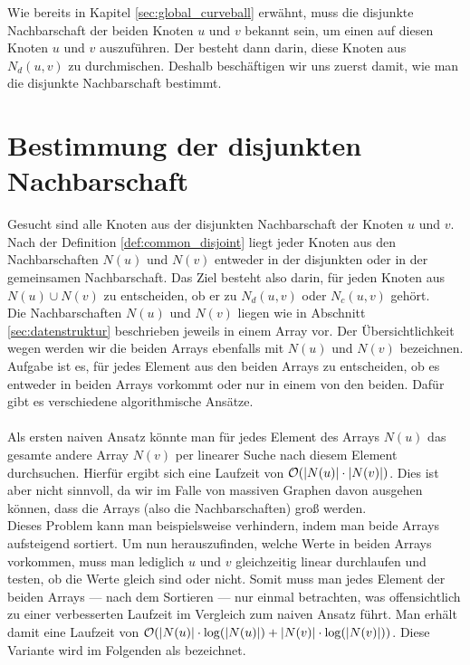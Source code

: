Wie bereits in Kapitel \ref{sec:global_curveball} erwähnt, muss die disjunkte Nachbarschaft
der beiden Knoten $u$ und $v$ bekannt sein, um einen \ct{} auf diesen Knoten $u$ und $v$
auszuführen. Der \ct{} besteht dann darin, diese Knoten aus $N_{d}(u,v)$ zu durchmischen.
Deshalb beschäftigen wir uns zuerst damit, wie man die disjunkte Nachbarschaft bestimmt.


\section{Bestimmung der disjunkten Nachbarschaft}
\label{sec:common}
Gesucht sind alle Knoten aus der disjunkten Nachbarschaft der Knoten $u$ und $v$.
Nach der Definition \ref{def:common_disjoint} liegt jeder Knoten aus den Nachbarschaften $N(u)$ und $N(v)$ 
entweder in der disjunkten oder in der gemeinsamen Nachbarschaft. Das Ziel besteht also darin, 
für jeden Knoten aus $N(u) \cup N(v)$ zu entscheiden, ob er zu $N_{d}(u,v)$ oder $N_{c}(u,v)$ gehört.
\\

Die Nachbarschaften $N(u)$ und $N(v)$ liegen wie in Abschnitt \ref{sec:datenstruktur} beschrieben jeweils
in einem Array vor. Der Übersichtlichkeit 
wegen werden wir die beiden
Arrays ebenfalls mit $N(u)$ und $N(v)$ bezeichnen. Aufgabe ist es,
 für jedes Element aus den beiden Arrays zu entscheiden,
ob es entweder in beiden Arrays vorkommt oder nur in einem von den beiden. Dafür 
gibt es verschiedene algorithmische Ansätze.
\\
\\
Als ersten naiven Ansatz könnte man für jedes Element des Arrays $N(u)$ das gesamte andere 
Array $N(v)$ per linearer Suche nach diesem Element durchsuchen. Hierfür ergibt sich eine Laufzeit von
$\mathcal{O}(|N(u)|\cdot|N(v)|)$. Dies ist aber nicht sinnvoll, da wir 
im Falle von massiven Graphen davon ausgehen können, dass die Arrays (also die Nachbarschaften)
 groß werden. 
\\
Dieses Problem kann man beispielsweise verhindern, indem man beide Arrays aufsteigend sortiert. 
Um nun herauszufinden,
welche Werte in beiden Arrays vorkommen, muss man lediglich $u$ und $v$ gleichzeitig linear durchlaufen
und testen, ob die Werte gleich sind oder nicht. Somit muss man jedes 
Element der beiden Arrays --- nach dem Sortieren --- 
nur einmal betrachten, was offensichtlich zu einer verbesserten Laufzeit im Vergleich zum naiven
Ansatz führt. Man erhält damit eine Laufzeit von $\mathcal{O}(|N(u)|\cdot \log (|N(u)|)  + |N(v)|\cdot\log(|N(v)|))$. 
Diese Variante wird im Folgenden als \SorSor{} bezeichnet. 
\\

